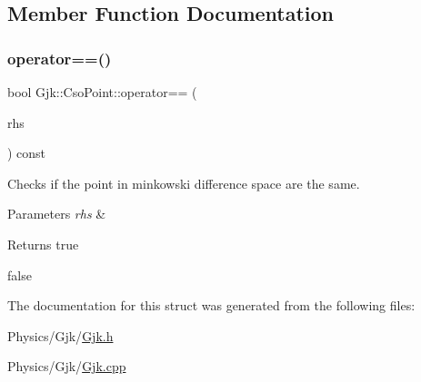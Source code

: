 \subsection{Member Function Documentation}
\mbox{\label{structGjk_1_1CsoPoint_ad7e23024e0114e73d6978760a209782c}} 
\subsubsection{\texorpdfstring{operator==()}{operator==()}}
{\footnotesize\ttfamily bool Gjk\+::\+Cso\+Point\+::operator== (\begin{DoxyParamCaption}\item[{const \hyperlink{structGjk_1_1CsoPoint}{Cso\+Point} \&}]{rhs }\end{DoxyParamCaption}) const}



Checks if the point in minkowski difference space are the same. 


\begin{DoxyParams}{Parameters}
{\em rhs} & \\
\hline
\end{DoxyParams}
\begin{DoxyReturn}{Returns}
true 

false 
\end{DoxyReturn}


The documentation for this struct was generated from the following files\+:\begin{DoxyCompactItemize}
\item 
Physics/\+Gjk/\hyperlink{Gjk_8h}{Gjk.\+h}\item 
Physics/\+Gjk/\hyperlink{Gjk_8cpp}{Gjk.\+cpp}\end{DoxyCompactItemize}
